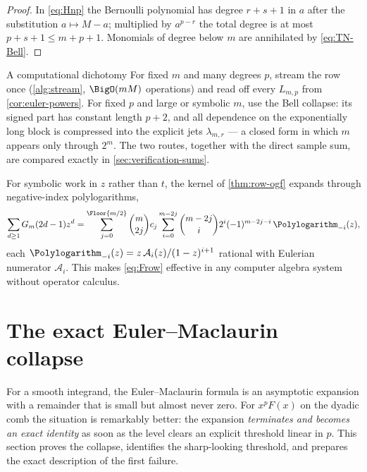 \begin{proof}
In \eqref{eq:Hnp} the Bernoulli polynomial has degree $r+s+1$ in $a$
after the substitution $a\mapsto M-a$; multiplied by $a^{p-r}$ the
total degree is at most $p+s+1\le m+p+1$.  Monomials of degree below
$m$ are annihilated by \eqref{eq:TN-Bell}.
\end{proof}

\begin{statusbox}{A computational dichotomy}
For fixed $m$ and many degrees $p$, stream the row once
(\cref{alg:stream}, $\BigO(mM)$ operations) and read off every
$L_{m,p}$ from \cref{cor:euler-powers}.  For fixed $p$ and large or
symbolic $m$, use the Bell collapse: its signed part has constant
length $p+2$, and all dependence on the exponentially long block is
compressed into the explicit jets $\lambda_{m,r}$ --- a closed form in
which $m$ appears only through $2^{m}$.  The two routes, together with
the direct sample sum, are compared exactly in
\cref{sec:verification-sums}.
\end{statusbox}

\begin{remark}
For symbolic work in $z$ rather than $t$, the kernel of
\cref{thm:row-ogf} expands through negative-index polylogarithms,
\begin{equation}
 \sum_{d\ge1}G_m(2d-1)z^{d}
 =\sum_{j=0}^{\Floor{m/2}}\binom m{2j}c_j
 \sum_{i=0}^{m-2j}\binom{m-2j}{i}2^{i}(-1)^{m-2j-i}\,
 \Polylogarithm_{-i}(z),
 \label{eq:B-polylog}
\end{equation}
each $\Polylogarithm_{-i}(z)=z\,\mathcal A_i(z)/(1-z)^{i+1}$ rational with
Eulerian numerator $\mathcal A_i$.  This makes
\eqref{eq:Frow} effective in any computer algebra system without
operator calculus.
\end{remark}

\section{The exact Euler--Maclaurin collapse}
\label{sec:em}

For a smooth integrand, the Euler--Maclaurin formula is an asymptotic
expansion with a remainder that is small but almost never zero.  For
$x^{p}F(x)$ on the dyadic comb the situation is remarkably better: the
expansion \emph{terminates and becomes an exact identity} as soon as
the level clears an explicit threshold linear in $p$.  This section
proves the collapse, identifies the sharp-looking threshold, and
prepares the exact description of the first failure.

